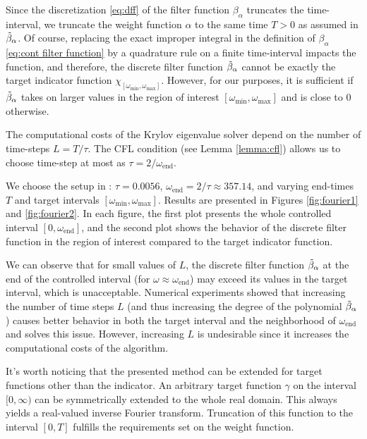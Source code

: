 \documentclass[a4paper,11pt,bibliography=totoc,listof=totoc,headinclude=true,cleardoublepage=empty,oneside]{scrbook}
\newcommand{\dff}{\Tilde{\beta}_\alpha}
\newcommand{\e}{\mathrm{end}}
\begin{document}
Since the discretization \eqref{eq:dff} of the filter function $\beta_\alpha$ truncates the time-interval, we truncate the weight function $\alpha$ to the same time $T>0$ as assumed in $\dff$. Of course, replacing the exact improper integral in the definition of $\beta_\alpha$ \eqref{eq:cont filter function} by a quadrature rule on a finite time-interval impacts the function, and therefore, the discrete filter function $\dff$ cannot be exactly the target indicator function $\chi_{\left[\omega_{\min}, \omega_{\max}\right]}$. However, for our purposes, it is sufficient if $\dff$ takes on larger values in the region of interest $\left[\omega_{\min}, \omega_{\max}\right]$ and is close to 0 otherwise.

The computational costs of the Krylov eigenvalue solver depend on the number of time-steps $L=T/\tau$. The CFL condition (see Lemma \ref{lemma:cfl}) allows us to choose time-step at most as $\tau = 2/\omega_{\e}$.

We choose the setup in \cite[section 3.1.2]{nannen}: $\tau = 0.0056$, $\omega_\e = 2/\tau \approx 357.14$, and varying end-times $T$ and target intervals $\left[\omega_{\min}, \omega_{\max}\right]$. Results are presented in Figures \ref{fig:fourier1} and \ref{fig:fourier2}. In each figure, the first plot presents the whole controlled interval $\left[0, \omega_\e\right]$, and the second plot shows the behavior of the discrete filter function in the region of interest compared to the target indicator function.

We can observe that for small values of $L$, the discrete filter function $\dff$ at the end of the controlled interval (for $\omega \approx \omega_\e$) may exceed its values in the target interval, which is unacceptable. Numerical experiments showed that increasing the number of time steps $L$ (and thus increasing the degree of the polynomial $\dff$) causes better behavior in both the target interval and the neighborhood of $\omega_\e$ and solves this issue. However, increasing $L$ is undesirable since it increases the computational costs of the algorithm.

It's worth noticing that the presented method can be extended for target functions other than the indicator. An arbitrary target function $\gamma$ on the interval $[0, \infty)$ can be symmetrically extended to the whole real domain. This always yields a real-valued inverse Fourier transform. Truncation of this function to the interval $[0, T]$ fulfills the requirements set on the weight function.
\end{document}
